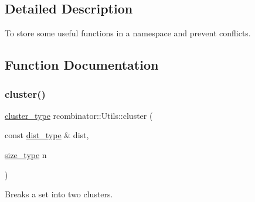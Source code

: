 \subsection{Detailed Description}
To store some useful functions in a namespace and prevent conflicts. 

\subsection{Function Documentation}
\mbox{\label{namespacercombinator_1_1Utils_a7dbf5072b1cc3d4756c46b4acdc59de9}} 
\subsubsection{\texorpdfstring{cluster()}{cluster()}}
{\footnotesize\ttfamily \mbox{\hyperlink{constants_8h_aa5d5324de5e3188e825da6a7a40df01d}{cluster\+\_\+type}} rcombinator\+::\+Utils\+::cluster (\begin{DoxyParamCaption}\item[{const \mbox{\hyperlink{constants_8h_a0d6ecb761af58b56a675077153fa9ba9}{dist\+\_\+type}} \&}]{dist,  }\item[{\mbox{\hyperlink{constants_8h_abcd18a5521fc90ff6e7b00e4fee98397}{size\+\_\+type}}}]{n }\end{DoxyParamCaption})}



Breaks a set into two clusters. 


